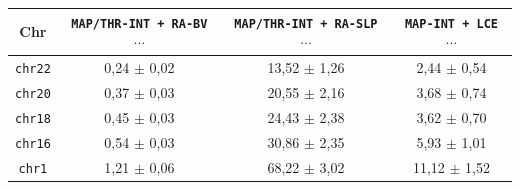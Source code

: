 \begin{table}
\begin{tabular}{c||c|c|c}
    \textbf{Chr}
    & \textbf{\texttt{MAP/THR-INT + RA-BV $\cdots$}}
    & \textbf{\texttt{MAP/THR-INT + RA-SLP $\cdots$}}
    & \textbf{\texttt{MAP-INT + LCE $\cdots$}}\\
    \hline
    \hline
    \texttt{chr22} & 0,24 $\pm$ 0,02 & 13,52 $\pm$ 1,26 & 2,44 $\pm$ 0,54 \\
    \texttt{chr20} & 0,37 $\pm$ 0,03 & 20,55 $\pm$ 2,16 & 3,68 $\pm$ 0,74 \\
    \texttt{chr18} & 0,45 $\pm$ 0,03 & 24,43 $\pm$ 2,38 & 3,62 $\pm$ 0,70 \\
    \texttt{chr16} & 0,54 $\pm$ 0,03 & 30,86 $\pm$ 2,35 & 5,93 $\pm$ 1,01 \\
    \texttt{chr1} & 1,21 $\pm$ 0,06 & 68,22 $\pm$ 3,02 & 11,12 $\pm$ 1,52

  \end{tabular}
\end{table}

